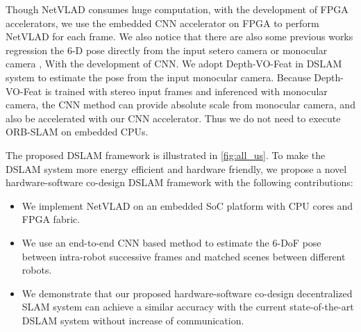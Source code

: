 
Though NetVLAD consumes huge computation, with the development of FPGA accelerators, we use the embedded CNN accelerator on FPGA \cite{deephi} to perform NetVLAD for each frame.
We also notice that there are also some previous works regression the 6-D pose directly from the input setero camera \cite{setero2018} or monocular camera \cite{Li:2018ca8,Zhan:2018e92}, With the development of CNN.
We adopt Depth-VO-Feat \cite{Zhan:2018e92} in DSLAM system to estimate the pose from the input monocular camera.
Because Depth-VO-Feat is trained with stereo input frames and inferenced with monocular camera, the CNN method can provide absolute scale from monocular camera, and also be accelerated with our CNN accelerator. Thus we do not need to execute ORB-SLAM on embedded CPUs. 

The proposed DSLAM framework is illustrated in \cref{fig:all_us}. To make the DSLAM system more energy efficient and hardware friendly, we propose a novel hardware-software co-design DSLAM framework with the following contributions:
\begin{itemize}
\item We implement NetVLAD on an embedded SoC platform with CPU cores and FPGA fabric.
\item We use an end-to-end CNN based method to estimate the 6-DoF pose between intra-robot successive frames and matched scenes between different robots.
\item We demonstrate that our proposed hardware-software co-design decentralized SLAM system can achieve a similar accuracy with the current state-of-the-art DSLAM system without increase of communication.
\end{itemize}

